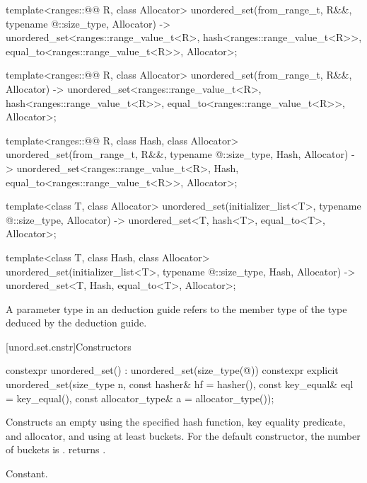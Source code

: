 \begin{codeblock}
{  template<ranges::@@ R, class Allocator>
    unordered_set(from_range_t, R&&, typename @\seebelow@::size_type, Allocator)
      -> unordered_set<ranges::range_value_t<R>, hash<ranges::range_value_t<R>>,
                       equal_to<ranges::range_value_t<R>>, Allocator>;

  template<ranges::@@ R, class Allocator>
    unordered_set(from_range_t, R&&, Allocator)
      -> unordered_set<ranges::range_value_t<R>, hash<ranges::range_value_t<R>>,
                       equal_to<ranges::range_value_t<R>>, Allocator>;

  template<ranges::@@ R, class Hash, class Allocator>
    unordered_set(from_range_t, R&&, typename @\seebelow@::size_type, Hash, Allocator)
      -> unordered_set<ranges::range_value_t<R>, Hash,
                       equal_to<ranges::range_value_t<R>>, Allocator>;

  template<class T, class Allocator>
    unordered_set(initializer_list<T>, typename @\seebelow@::size_type, Allocator)
      -> unordered_set<T, hash<T>, equal_to<T>, Allocator>;

  template<class T, class Hash, class Allocator>
    unordered_set(initializer_list<T>, typename @\seebelow@::size_type, Hash, Allocator)
      -> unordered_set<T, Hash, equal_to<T>, Allocator>;
}
\end{codeblock}

\pnum
A  parameter type in an  deduction guide
refers to the  member type of
the type deduced by the deduction guide.

[unord.set.cnstr]{Constructors}

%
\begin{itemdecl}
constexpr unordered_set() : unordered_set(size_type(@\seebelow@)) { }
constexpr explicit unordered_set(size_type n, const hasher& hf = hasher(),
                                 const key_equal& eql = key_equal(),
                                 const allocator_type& a = allocator_type());
\end{itemdecl}

\begin{itemdescr}
\pnum
\effects
Constructs an empty  using the
specified hash function, key equality predicate, and allocator, and
using at least  buckets.  For the default constructor,
the number of buckets is .
 returns .

\pnum
\complexity
Constant.
\end{itemdescr}

